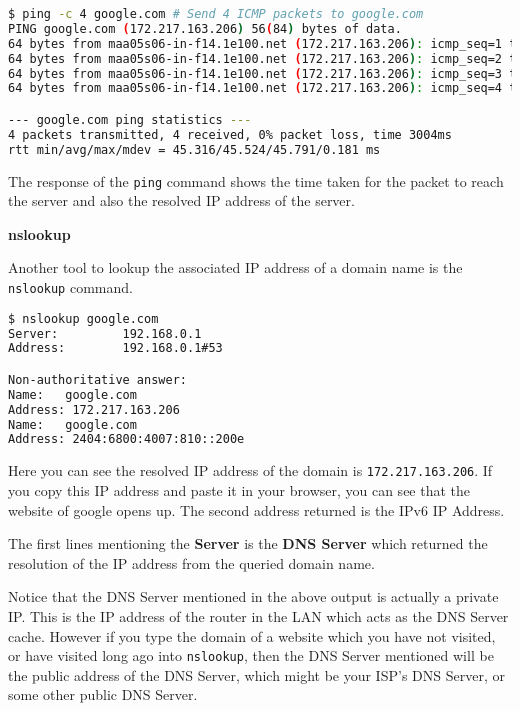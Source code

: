 \begin{lstlisting}[language=bash]
$ ping -c 4 google.com # Send 4 ICMP packets to google.com
PING google.com (172.217.163.206) 56(84) bytes of data.
64 bytes from maa05s06-in-f14.1e100.net (172.217.163.206): icmp_seq=1 ttl=114 time=45.6 ms
64 bytes from maa05s06-in-f14.1e100.net (172.217.163.206): icmp_seq=2 ttl=114 time=45.4 ms
64 bytes from maa05s06-in-f14.1e100.net (172.217.163.206): icmp_seq=3 ttl=114 time=45.3 ms
64 bytes from maa05s06-in-f14.1e100.net (172.217.163.206): icmp_seq=4 ttl=114 time=45.8 ms

--- google.com ping statistics ---
4 packets transmitted, 4 received, 0% packet loss, time 3004ms
rtt min/avg/max/mdev = 45.316/45.524/45.791/0.181 ms
\end{lstlisting}

The response of the \lstinline|ping| command shows the
time taken for the packet to reach the server and
also the resolved IP address of the server.

\textbf{nslookup}

Another tool to lookup the associated IP address of
a domain name is the \lstinline|nslookup| command.

\begin{lstlisting}[language=bash]
$ nslookup google.com
Server:         192.168.0.1
Address:        192.168.0.1#53

Non-authoritative answer:
Name:   google.com
Address: 172.217.163.206
Name:   google.com
Address: 2404:6800:4007:810::200e
\end{lstlisting}

Here you can see the resolved IP address of the domain
is \lstinline|172.217.163.206|. If you copy this IP address
and paste it in your browser, you can see that the
website of google opens up.
The second address returned is the IPv6 IP Address.

The first lines mentioning the \textbf{Server}
is the \textbf{DNS Server} which returned the
resolution of the IP address from the queried
domain name.

\begin{remark}
  Notice that the DNS Server mentioned in the above
  output is actually a private IP. This is the IP
  address of the router in the LAN which acts as
  the DNS Server cache. However if you type the
  domain of a website which you have not visited,
  or have visited long ago into \lstinline|nslookup|,
  then the DNS Server mentioned will be the public
  address of the DNS Server, which might be your
  ISP's DNS Server, or some other public DNS Server.
\end{remark}


